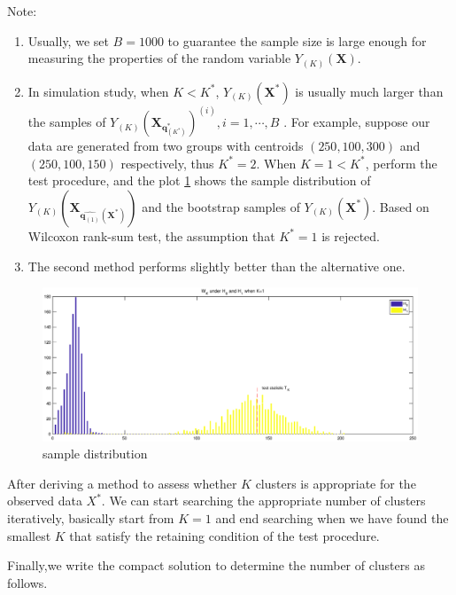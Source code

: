 \documentclass[12pt]{article}
\begin{document}
Note: 
\begin{enumerate}[(1):]
\item Usually, we set $B=1000$ to guarantee the sample size is large enough for measuring the properties of the random variable $Y_{(K)}(\pmb X)$.
\item In simulation study, when $K<K^*$, $Y_{(K)}(\pmb X^*)$ is usually much larger than the samples of $Y_{(K)}(\pmb X_{\pmb q_{(K^*)}^*})^{(i)},i=1,\cdots,B$ . For example, suppose our data are generated from two groups with centroids $(250,100,300)$ and $(250,100,150)$ respectively, thus $K^*=2$. When $K=1<K^*$, perform the test procedure, and the plot \ref{fig:sample_distribution} shows the sample distribution of $Y_{(K)}(\pmb X_{\hat{\pmb q_{(1)}}(\pmb X^*)})$ and the bootstrap samples of $Y_{(K)}(\pmb X^*)$. Based on Wilcoxon rank-sum test, the assumption that $K^*=1$ is rejected.

\item The second method performs slightly better than the alternative one.

\end{enumerate}

\begin{figure} [htp]
 \includegraphics[width=\textwidth,height=0.6\textheight]{./figure/sample_distribution.eps}
  \vspace{-30pt}
  \caption{sample distribution }\label{fig:sample_distribution}
\end{figure} %


After deriving a method to assess whether $K$ clusters is appropriate for the observed data $X^*$. We can start searching the appropriate number of clusters iteratively, basically start from $K=1$ and end searching when we have found the smallest $K$ that satisfy the retaining condition of the test procedure.

Finally,we write the compact solution to determine the number of clusters as follows.
\end{document}
